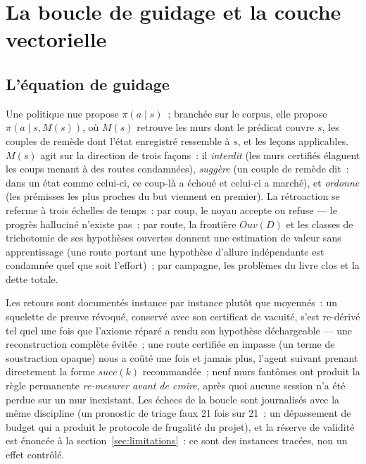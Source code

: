 \documentclass[11pt]{article}
\theoremstyle{remark}\newtheorem{example}{Exemple}
\begin{document}
\section{La boucle de guidage et la couche vectorielle}
\label{sec:vectors}
\subsection{L'équation de guidage}
Une politique nue propose $\pi(a \mid s)$~; branchée sur le corpus, elle propose
$\pi(a \mid s, M(s))$, où $M(s)$ retrouve les murs dont le prédicat couvre $s$, les
couples de remède dont l'état enregistré ressemble à $s$, et les leçons applicables.
$M(s)$ agit sur la direction de trois façons~: il \emph{interdit} (les murs certifiés
élaguent les coups menant à des routes condamnées), \emph{suggère} (un couple de remède
dit~: dans un état comme celui-ci, ce coup-là a échoué et celui-ci a marché), et
\emph{ordonne} (les prémisses les plus proches du but viennent en premier). La
rétroaction se referme à trois échelles de temps~: par coup, le noyau accepte ou refuse
--- le progrès halluciné n'existe pas~; par route, la frontière $\mathit{Ouv}(D)$ et
les classes de trichotomie de ses hypothèses ouvertes donnent une estimation de valeur
sans apprentissage (une route portant une hypothèse d'allure indépendante est condamnée
quel que soit l'effort)~; par campagne, les problèmes du livre clos et la dette totale.

Les retours sont documentés instance par instance plutôt que moyennés~: un squelette de
preuve révoqué, conservé avec son certificat de vacuité, s'est re-dérivé tel quel une
fois que l'axiome réparé a rendu son hypothèse déchargeable --- une reconstruction
complète évitée~; une route certifiée en impasse (un terme de soustraction opaque) nous
a coûté une fois et jamais plus, l'agent suivant prenant directement la forme
$\mathit{succ}(k)$ recommandée~; neuf murs fantômes ont produit la règle permanente
\emph{re-mesurer avant de croire}, après quoi aucune session n'a été perdue sur un mur
inexistant. Les échecs de la boucle sont journalisés avec la même discipline (un
pronostic de triage faux 21 fois sur 21~; un dépassement de budget qui a produit le
protocole de frugalité du projet), et la réserve de validité est énoncée à la
section~\ref{sec:limitations}~: ce sont des instances tracées, non un effet contrôlé.
\end{document}
